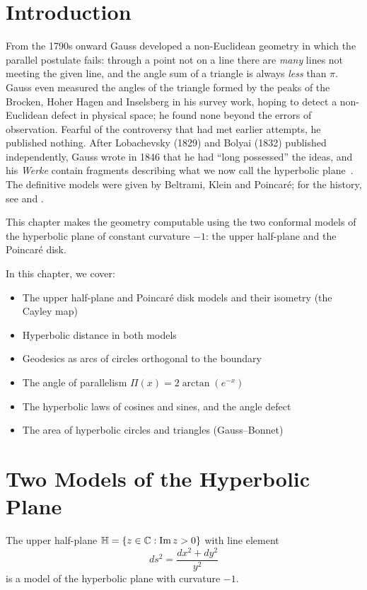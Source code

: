 \section{Introduction}

From the 1790s onward Gauss developed a non-Euclidean geometry  in which the parallel postulate fails: through a point not on a line there are \emph{many} lines not meeting the given line, and the angle sum of a triangle is always \emph{less} than $\pi$. Gauss even measured the angles of the triangle formed by the peaks of the Brocken, Hoher Hagen and Inselsberg in his survey work, hoping to detect a non-Euclidean defect in physical space; he found none beyond the errors of observation. Fearful of the controversy that had met earlier attempts, he published nothing. After Lobachevsky (1829) and Bolyai (1832) published independently, Gauss wrote in 1846 that he had ``long possessed'' the ideas, and his \textit{Werke} contain fragments describing what we now call the hyperbolic plane~\cite{gauss-works}. The definitive models were given by Beltrami, Klein and Poincar\'e; for the history, see \cite{bonola} and \cite{milnor-hyperbolic}.

This chapter makes the geometry computable using the two conformal models of the hyperbolic plane of constant curvature $-1$: the upper half-plane and the Poincar\'e disk.

In this chapter, we cover:
\begin{itemize}
    \item The upper half-plane and Poincar\'e disk models and their isometry (the Cayley map)
    \item Hyperbolic distance in both models
    \item Geodesics as arcs of circles orthogonal to the boundary
    \item The angle of parallelism  $\Pi(x) = 2\arctan(e^{-x})$
    \item The hyperbolic laws of cosines and sines, and the angle defect
    \item The area of hyperbolic circles and triangles (Gauss--Bonnet)
\end{itemize}

\section{Two Models of the Hyperbolic Plane}

\begin{definition}
The upper half-plane $\mathbb{H} = \{z \in \mathbb{C} : \operatorname{Im} z > 0\}$ with line element
\[
ds^2 = \frac{dx^2 + dy^2}{y^2}
\]
is a model of the hyperbolic plane with curvature $-1$.
\end{definition}


